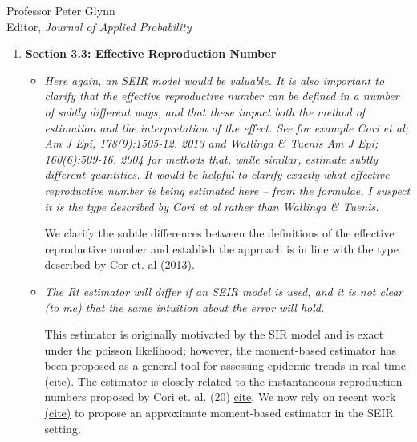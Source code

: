 \documentclass[11pt]{letter} %
\begin{document}
\begin{letter}{Professor
	Peter Glynn\\
	Editor, {\em Journal of Applied Probability}}
\begin{enumerate}
\begin{itemize}
	The SIR model in Section 3.2 is replaced by the SEIR model.  We highlight that the SEIR model has been shown to better represent the SARS-CoV-2 dynamics.  Figure XX which presents the ratio estimate and potential bias has been updated accordingly.   The conclusions remain largely the same. The only difference from the prior manuscript is that the peak in bias prior to the ratio going less than 1 is less pronounced (was up to 5, now up to 2).
\end{itemize}
\item {\bf Section 3.3: Effective Reproduction Number}
\begin{itemize}
	\item {\it Here again, an SEIR model would be valuable. It is also important to clarify that the effective reproductive number can be defined in a number of subtly different ways, and that these impact both the method of estimation and the interpretation of the effect. See for example Cori et al; Am J Epi, 178(9):1505-12. 2013 and Wallinga \& Tuenis Am J Epi; 160(6):509-16. 2004 for methods that, while similar, estimate subtly different quantities. It would be helpful to clarify exactly what effective reproductive number is being estimated here – from the formulae, I suspect it is the type described by Cori et al rather than Wallinga \& Tuenis.}
	\vspace{5mm}

	We clarify the subtle differences between the definitions of the effective reproductive number and establish the approach is in line with the type described by Cor et. al (2013).
	\vspace{5mm}
	\item {\it The Rt estimator will differ if an SEIR model is used, and it is not clear (to me) that the same intuition about the error will hold.}
	\vspace{5mm}


	This estimator is originally motivated by the SIR model and is exact under the poisson likelihood; however, the moment-based estimator has been proposed as a general tool for assessing epidemic trends in real time (\href{https://academic.oup.com/aje/article/189/11/1438/5864525?searchresult=1}{cite}).  The estimator is closely related to the instantaneous reproduction numbers proposed by Cori et. al. (20) \href{https://academic.oup.com/aje/article/178/9/1505/89262?searchresult=1}{cite}.  We now rely on recent work \href{https://www.nature.com/articles/s41598-020-76563-8.pdf?origin=ppub}{(cite)} to propose an approximate moment-based estimator in the SEIR setting.
	\vspace{5mm}


\end{itemize}
\end{enumerate}
\end{letter}
\end{document}

